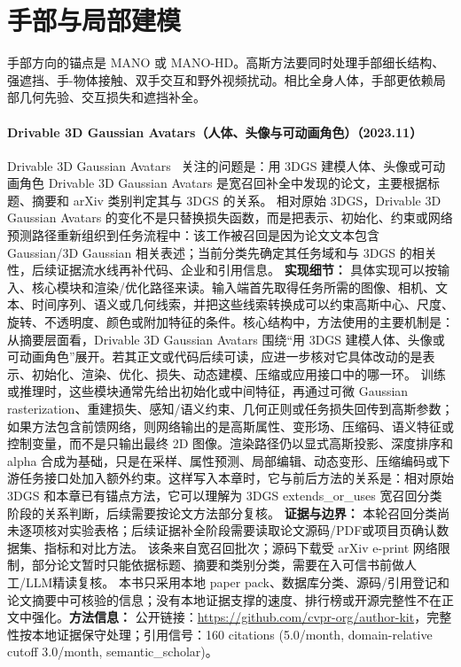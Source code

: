 \section{手部与局部建模}

手部方向的锚点是 MANO 或 MANO-HD。高斯方法要同时处理手部细长结构、强遮挡、手-物体接触、双手交互和野外视频扰动。相比全身人体，手部更依赖局部几何先验、交互损失和遮挡补全。
\paragraph{Drivable 3D Gaussian Avatars（人体、头像与可动画角色）（2023.11）}
Drivable 3D Gaussian Avatars~\cite{2311_08581} 关注的问题是：用 3DGS 建模人体、头像或可动画角色 Drivable 3D Gaussian Avatars 是宽召回补全中发现的论文，主要根据标题、摘要和 arXiv 类别判定其与 3DGS 的关系。
相对原始 3DGS，Drivable 3D Gaussian Avatars 的变化不是只替换损失函数，而是把表示、初始化、约束或网络预测路径重新组织到任务流程中：该工作被召回是因为论文文本包含 Gaussian/3D Gaussian 相关表述；当前分类先确定其任务域和与 3DGS 的相关性，后续证据流水线再补代码、企业和引用信息。
\textbf{实现细节：} 具体实现可以按输入、核心模块和渲染/优化路径来读。输入端首先取得任务所需的图像、相机、文本、时间序列、语义或几何线索，并把这些线索转换成可以约束高斯中心、尺度、旋转、不透明度、颜色或附加特征的条件。核心结构中，方法使用的主要机制是：从摘要层面看，Drivable 3D Gaussian Avatars 围绕“用 3DGS 建模人体、头像或可动画角色”展开。若其正文或代码后续可读，应进一步核对它具体改动的是表示、初始化、渲染、优化、损失、动态建模、压缩或应用接口中的哪一环。 训练或推理时，这些模块通常先给出初始化或中间特征，再通过可微 Gaussian rasterization、重建损失、感知/语义约束、几何正则或任务损失回传到高斯参数；如果方法包含前馈网络，则网络输出的是高斯属性、变形场、压缩码、语义特征或控制变量，而不是只输出最终 2D 图像。渲染路径仍以显式高斯投影、深度排序和 alpha 合成为基础，只是在采样、属性预测、局部编辑、动态变形、压缩编码或下游任务接口处加入额外约束。这样写入本章时，它与前后方法的关系是：相对原始 3DGS 和本章已有锚点方法，它可以理解为 3DGS extends\_or\_uses 宽召回分类阶段的关系判断，后续需要按论文方法部分复核。
\textbf{证据与边界：} 本轮召回分类尚未逐项核对实验表格；后续证据补全阶段需要读取论文源码/PDF或项目页确认数据集、指标和对比方法。 该条来自宽召回批次；源码下载受 arXiv e-print 网络限制，部分论文暂时只能依据标题、摘要和类别分类，需要在入可信书前做人工/LLM精读复核。 本书只采用本地 paper pack、数据库分类、源码/引用登记和论文摘要中可核验的信息；没有本地证据支撑的速度、排行榜或开源完整性不在正文中强化。\textbf{方法信息：} 公开链接：\url{https://github.com/cvpr-org/author-kit}，完整性按本地证据保守处理；引用信号：160 citations (5.0/month, domain-relative cutoff 3.0/month, semantic\_scholar)。
